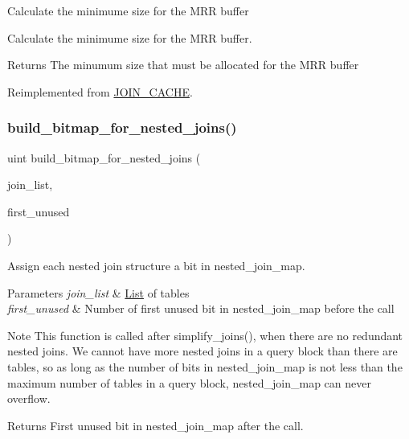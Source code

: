 Calculate the minimume size for the M\+RR buffer

Calculate the minimume size for the M\+RR buffer.

\begin{DoxyReturn}{Returns}
The minumum size that must be allocated for the M\+RR buffer 
\end{DoxyReturn}


Reimplemented from \mbox{\hyperlink{classJOIN__CACHE_a22f1df0156fa6d176df6d6e6d4b84916}{J\+O\+I\+N\+\_\+\+C\+A\+C\+HE}}.

\mbox{\label{group__Query__Optimizer_gab18726347ecf92d8985617dda1d60ba3}} 
\subsubsection{\texorpdfstring{build\+\_\+bitmap\+\_\+for\+\_\+nested\+\_\+joins()}{build\_bitmap\_for\_nested\_joins()}}
{\footnotesize\ttfamily uint build\+\_\+bitmap\+\_\+for\+\_\+nested\+\_\+joins (\begin{DoxyParamCaption}\item[{\mbox{\hyperlink{classList}{List}}$<$ \mbox{\hyperlink{structTABLE__LIST}{T\+A\+B\+L\+E\+\_\+\+L\+I\+ST}} $>$ $\ast$}]{join\+\_\+list,  }\item[{uint}]{first\+\_\+unused }\end{DoxyParamCaption})}

Assign each nested join structure a bit in nested\+\_\+join\+\_\+map.


\begin{DoxyParams}{Parameters}
{\em join\+\_\+list} & \mbox{\hyperlink{classList}{List}} of tables \\
\hline
{\em first\+\_\+unused} & Number of first unused bit in nested\+\_\+join\+\_\+map before the call\\
\hline
\end{DoxyParams}
\begin{DoxyNote}{Note}
This function is called after simplify\+\_\+joins(), when there are no redundant nested joins. We cannot have more nested joins in a query block than there are tables, so as long as the number of bits in nested\+\_\+join\+\_\+map is not less than the maximum number of tables in a query block, nested\+\_\+join\+\_\+map can never overflow.
\end{DoxyNote}
\begin{DoxyReturn}{Returns}
First unused bit in nested\+\_\+join\+\_\+map after the call. 
\end{DoxyReturn}
\mbox{\label{group__Query__Optimizer_ga51f49ad71fa53a75fa8ebae08cf775cc}} 
